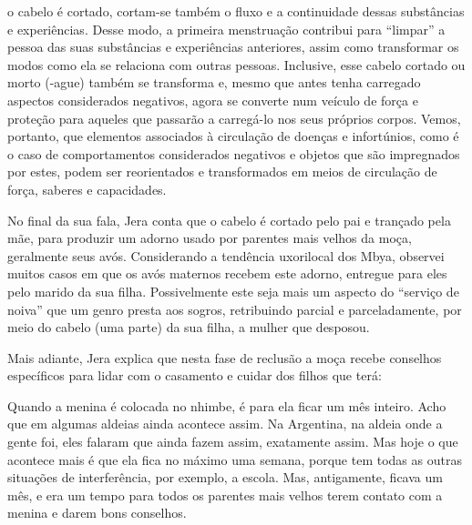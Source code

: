 \documentclass{article}
\begin{document}
o cabelo \'e cortado, cortam-se tamb\'em o fluxo e a continuidade
dessas subst\^ancias e experi\^encias. Desse modo, a primeira
menstrua\c{c}\~ao contribui para
{\textquotedblleft}limpar{\textquotedblright} a pessoa das suas
subst\^ancias e experi\^encias anteriores, assim como transformar os
modos como ela se relaciona com outras pessoas. Inclusive, esse cabelo
cortado ou morto (-ague) tamb\'em se transforma e, mesmo que antes
tenha carregado aspectos considerados negativos, agora se converte num
ve\'iculo de for\c{c}a e prote\c{c}\~ao para aqueles que passar\~ao a
carreg\'a-lo nos seus pr\'oprios corpos. Vemos, portanto, que elementos
associados \`a circula\c{c}\~ao de doen\c{c}as e infort\'unios, como
\'e o caso de comportamentos considerados negativos e objetos que s\~ao
impregnados por estes, podem ser reorientados e transformados em meios
de circula\c{c}\~ao de for\c{c}a, saberes e capacidades. 

No final da sua fala, Jera conta que o cabelo \'e cortado pelo pai e
tran\c{c}ado pela m\~ae, para produzir um adorno usado por parentes
mais velhos da mo\c{c}a, geralmente seus av\'os. Considerando a
tend\^encia uxorilocal dos Mbya, observei muitos casos em que os av\'os
maternos recebem este adorno, entregue para eles pelo marido da sua
filha. Possivelmente este seja mais um aspecto do
{\textquotedblleft}servi\c{c}o de noiva{\textquotedblright} que um
genro presta aos sogros, retribuindo parcial e parceladamente, por meio
do cabelo (uma parte) da sua filha, a mulher que desposou. 

Mais adiante, Jera explica que nesta fase de reclus\~ao a mo\c{c}a
recebe conselhos espec\'ificos para lidar com o casamento e cuidar dos
filhos que ter\'a: 

Quando a menina \'e colocada no nhimbe, \'e para ela ficar um m\^es
inteiro. Acho que em algumas aldeias ainda acontece assim. Na
Argentina, na aldeia onde a gente foi, eles falaram que ainda fazem
assim, exatamente assim. Mas hoje o que acontece mais \'e que ela fica
no m\'aximo uma semana, porque tem todas as outras situa\c{c}\~oes de
interfer\^encia, por exemplo, a escola. Mas, antigamente, ficava um
m\^es, e era um tempo para todos os parentes mais velhos terem contato
com a menina e darem bons conselhos. 
\end{document}
